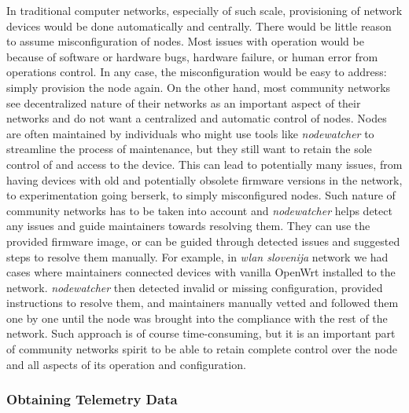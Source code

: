 \documentclass[5p,sort&compress]{elsarticle}
\newcommand{\nodewatcher}{\textit{nodewatcher}}
\newcommand{\wlanslovenija}{\textit{wlan slovenija}}
\begin{document}
In traditional computer networks, especially of such scale, provisioning of network devices would be done automatically and centrally.
There would be little reason to assume misconfiguration of nodes.
Most issues with operation would be because of software or hardware bugs, hardware failure, or human error from operations control.
In any case, the misconfiguration would be easy to address: simply provision the node again.
On the other hand, most community networks see decentralized nature of their networks as an important aspect of their networks and do not want a centralized and automatic control of nodes.
Nodes are often maintained by individuals who might use tools like \nodewatcher{} to streamline the process of maintenance, but they still want to retain the sole control of and access to the device.
This can lead to potentially many issues, from having devices with old and potentially obsolete firmware versions in the network, to experimentation going berserk, to simply misconfigured nodes.
Such nature of community networks has to be taken into account and \nodewatcher{} helps detect any issues and guide maintainers towards resolving them.
They can use the provided firmware image, or can be guided through detected issues and suggested steps to resolve them manually.
For example, in \wlanslovenija{} network we had cases where maintainers connected devices with vanilla OpenWrt installed to the network.
\nodewatcher{} then detected invalid or missing configuration, provided instructions to resolve them, and maintainers manually vetted and followed them one by one until the node was brought into the compliance with the rest of the network.
Such approach is of course time-consuming, but it is an important part of community networks spirit to be able to retain complete control over the node and all aspects of its operation and configuration.

\subsubsection{Obtaining Telemetry Data}
\end{document}
